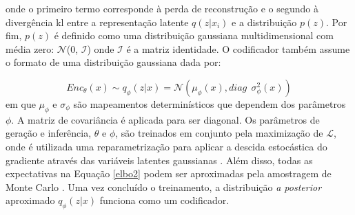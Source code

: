 \noindent onde o primeiro termo corresponde à perda de reconstrução e o segundo à divergência \acrshort{kl} entre a representação latente $q(z|x_i)$ e a distribuição $p(z)$.
Por fim, $p(z)$ é definido como uma distribuição gaussiana multidimensional com média zero: $\mathcal{N}$(0, $\mathcal{I}$) onde $\mathcal{I}$ é a matriz identidade. O codificador também assume o formato de uma distribuição gaussiana dada por:

\begin{equation}
Enc_{\theta}(x) \sim q_{\phi}(z|x) = \mathcal{N}(\mu_{\phi}(x), diag\ \ \sigma_{\phi}^2(x))
\end{equation}
\noindent em que $\mu_{\phi}$ e $\sigma_{\phi}$ são mapeamentos determinísticos que dependem dos parâmetros $\phi$. A matriz de covariância é aplicada para ser diagonal. Os parâmetros de geração e inferência, $\theta$ e  $\phi$, são treinados em conjunto pela maximização de $\mathcal{L}$, onde é utilizada uma reparametrização para aplicar a descida estocástica do gradiente através das variáveis latentes gaussianas \cite{sonderby2016ladder}. Além disso, todas as expectativas na Equação \ref{elbo2} podem ser aproximadas pela amostragem de Monte Carlo \cite{Goodfellow2016}.
Uma vez concluído o treinamento, a distribuição \textit{a posterior} aproximado $q_{\phi}(z|x)$ funciona como um codificador.







